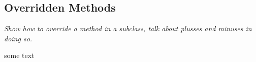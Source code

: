 \subsection{Overridden Methods}
\textit{Show how to override a method in a subclass, talk about plusses and minuses in doing so.}

some text
